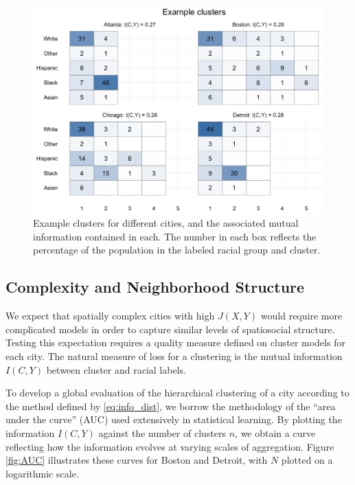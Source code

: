 	\begin{figure}
		\centering
		\includegraphics[width=\textwidth]{figs/example_clusters.png}
		\caption{Example clusters for different cities, and the associated mutual information contained in each. The number in each box reflects the percentage of the population in the labeled racial group and cluster. }
		\label{fig:clusters}
	\end{figure}

\subsection{Complexity and Neighborhood Structure}

	We expect that spatially complex cities with high $J(X,Y)$ would require more complicated models in order to capture similar levels of spatiosocial structure. Testing this expectation requires a quality measure defined on cluster models for each city. The natural measure of loss for a clustering is the mutual information $I(C,Y)$ between cluster and racial labels.
		
	To develop a global evaluation of the hierarchical clustering of a city according to the method defined by \eqref{eq:info_dist}, we borrow the methodology of the ``area under the curve'' (AUC) used extensively in statistical learning. By plotting the information $I(C,Y)$ against the number of clusters $n$, we obtain a curve reflecting how the information evolves at varying scales of aggregation. Figure \ref{fig:AUC} illustrates these curves for Boston and Detroit, with $N$ plotted on a logarithmic scale.  

